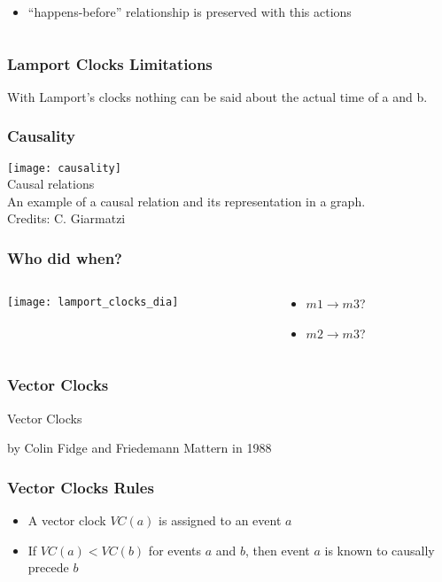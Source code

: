 \documentclass[aspectratio=169, 15pt,usenames,dvipsnames]{beamer}
\begin{document}
{\begin{gdblank}
\begin{columns}
\begin{column}{0.5\textwidth}
\begin{itemize}
					      \pause
					\item “happens-before” relationship is preserved with this actions
				\end{itemize}
			\end{column}	
		\end{columns}
	\end{gdblank}
	\begin{gdblank}
		\frametitle{Lamport Clocks Limitations}
		\centering
		\large		
		With Lamport’s clocks nothing can be said about the actual time of a and b.
	\end{gdblank}
	\begin{gdblank}
		\frametitle{Causality} 
		\texttt{[image: causality]}
		\centering\\Causal relations\\An example of a causal relation and its representation in a graph. 
		\tiny \\Credits: C. Giarmatzi
	\end{gdblank}   
	\begin{gdblank}
		\frametitle{Who did when?}
		\begin{columns}
			\begin{column}{0.5\textwidth}
				\texttt{[image: lamport\_clocks\_dia]}			
			\end{column}
			\begin{column}{0.5\textwidth}
				\begin{itemize}
					\item $m1 \rightarrow m3$?
					\item $m2 \rightarrow m3$? 
				\end{itemize}
			\end{column}	
		\end{columns}
	\end{gdblank}
	\begin{gdblank}
		\frametitle{Vector Clocks}
		\centering
		\LARGE
		Vector Clocks
		\par\large
		by Colin Fidge and Friedemann Mattern in 1988
	\end{gdblank}
	\begin{gdblank}
		\frametitle{Vector Clocks Rules}
		\centering
		\large
		\begin{itemize}
			\item A vector clock $VC(a)$ is assigned to an event $a$
			\item If $VC(a)<VC(b)$ for events $a$ and $b$, then event $a$ is known to causally precede $b$
		\end{itemize}

\end{gdblank}}
\end{document}
